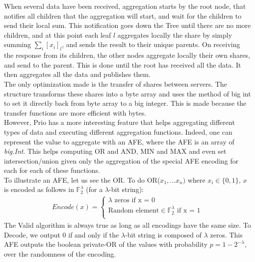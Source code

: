 \documentclass{article}
\begin{document}
When several data have been received, aggregation starts by the root node, that notifies all children that the aggregation will start, and wait for the children to send their local sum. This notification goes down the Tree until there are no more children, and at this point each leaf $l$ aggregates locally the share by simply summing $\sum_{i}[x_i]_l$, and sends the result to their unique parents. On receiving the response from its children, the other nodes aggregate locally their own shares, and send to the parent. This is done until the root has received all the data. It then aggregates all the data and publishes them.\\
The only optimization made is the transfer of shares between servers. The structure transforms these shares into a byte array and uses the method of big int to set it directly back from byte array to a big integer. This is made because the transfer functions are more efficient with bytes.\\

However, Prio has a more interesting feature that helps aggregating different types of data and executing different aggregation functions. Indeed, one can represent the value to aggregate with an AFE, where the AFE is an array of \textit{big.Int}. This helps computing OR and AND, MIN and MAX and even set intersection/union given only the aggregation of the special AFE encoding for each for each of these functions.\\
To illustrate an AFE, let us see the OR. To do OR($x_1,...x_n)$ where $x_i \in \{0,1\} $, $x$ is encoded as follows in $\mathbb{F}_2^{\lambda}$ (for a $\lambda$-bit string):
\begin{align*}
    Encode(x)=\left\{
                \begin{array}{ll}
                  \lambda	\text{  zeros}	\text{                                          
                  if x = 0}\\
                  \text{Random element} \in \mathbb{F}^{\lambda}_{2}		\text{											if x = 1}\\
                \end{array}
              \right.
\end{align*}
The Valid algorithm is always true as long as all encodings have the same size. To Decode, we output 0 if and only if the $\lambda$-bit string is composed of $\lambda$ zeros. This AFE outputs the boolean private-OR of the values with probability $p = 1- 2^{-\lambda}$, over the randomness of the encoding.
\end{document}
